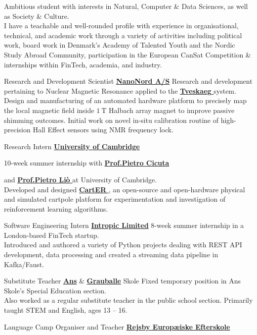 \documentclass[
	a4paper,
	10pt,
	profilepicstyle=profilecircle,
]{fortysecondscv}
\newcommand{\cvsectionvspace}{\vspace{-0.5em}}
\newcommand{\link}[2]{%
	{\href{#1}{\textcolor{maincolor!70}{\textbf{#2} \scriptsize{\faLink}}}}%
	}
\newcommand{\linknoicon}[2]{%
	{\href{#1}{\textcolor{maincolor!70}{\textbf{#2}}}}%
}
\begin{document}
\makefrontsidebar

Ambitious student with interests in Natural, Computer \& Data Sciences, as well as Society \& Culture.\\

I have a teachable and well-rounded profile with experience in organisational,
technical, and academic work
through a variety of activities including political work,
board work in Denmark's Academy of Talented Youth and the Nordic Study Abroad Community,
participation in the European CanSat Competition \&
internships within FinTech, academia, and industry.

\cvsectionvspace
\begin{cvtable}[2.0]
	{Research and Development Scientist}
	{\linknoicon{http://nanonord.dk/}{NanoNord A/S}}
	{
		Research and development pertaining to Nuclear Magnetic Resonance applied to
		the \link{http://www.nanonord.dk/}{Tveskaeg} system.
		Design and manufacturing of an automated hardware platform to precisely map
		the local magnetic field inside $\SI{1}{\tesla}$ Halbach array magnet to
		improve passive shimming outcomes.
		Initial work on novel in-situ calibration routine of high-precision Hall Effect
		sensors using NMR frequency lock.
	}

	{Research Intern}
	{\linknoicon{https://www.cam.ac.uk/}{University of Cambridge}}
	{
		10-week summer internship with  \link{https://www.phy.cam.ac.uk/directory/cicuta}{Prof.\@ Pietro Cicuta}
		and \link{https://www.cl.cam.ac.uk/~pl219/}{Prof.\@ Pietro Liò} at University of Cambridge.\\
		Developed and designed \link{https://jeppeklitgaard.github.io/CartER/}{CartER},
		an open-source and open-hardware physical and simulated cartpole platform
		for experimentation and investigation of reinforcement learning algorithms.
	}

	{Software Engineering Intern}
	{\linknoicon{https://intropic.io/}{Intropic Limited}}
	{
		8-week summer internship in a London-based FinTech startup.\\
		Introduced and authored a variety of Python projects dealing with REST API development,
		data processing and created a streaming data pipeline in Kafka/Faust.
	}

	{Substitute Teacher}
	{\linknoicon{https://ansskole.aula.dk/}{Ans} \& \linknoicon{https://grauballe-skole.aula.dk/}{Grauballe} Skole}{
		Fixed temporary position in Ans Skole's Special Education section.\\
		Also worked as a regular substitute teacher in the public school section.
		Primarily taught STEM and English, ages 13 -- 16.
	}

	{Language Camp Organiser and Teacher}
	{\linknoicon{https://www.rejsby-efterskole.dk/}{Rejsby Europæiske Efterskole}}{
	}
\end{cvtable}
\end{document}
